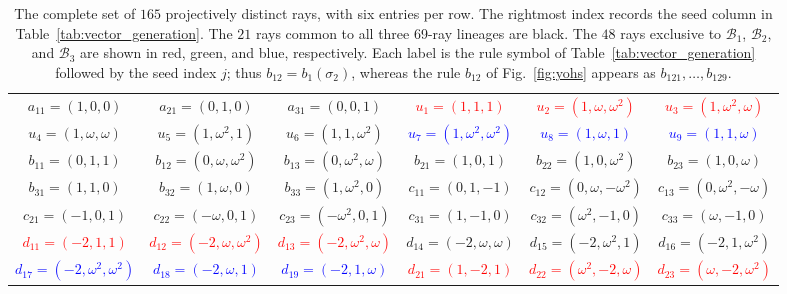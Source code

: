 \documentclass[%
  reprint,
  superscriptaddress,
  showkeys,
  amsmath,amssymb,
  aps,pra,
  longbibliography,
  floatfix,
  x11names
]{revtex4-2}
\begin{document}
\begin{table}[htbp!]
\caption{
The complete set of $165$ projectively distinct rays, with six entries per row.  The rightmost index records the seed column in Table~\ref{tab:vector_generation}.  The $21$ rays common to all three 69-ray lineages are black.  The $48$ rays exclusive to $\mathcal{B}_1$, $\mathcal{B}_2$, and $\mathcal{B}_3$ are shown in red, green, and blue, respectively.  Each label is the rule symbol of Table~\ref{tab:vector_generation} followed by the seed index $j$; thus $b_{12}=b_1(\sigma_2)$, whereas the rule $b_{12}$ of Fig.~\ref{fig:yohs} appears as $b_{121},\ldots,b_{129}$.
}
\label{tab:noncollinear_vectors_6col}
\footnotesize %
\begin{ruledtabular}
\begin{tabular}{*{6}{c}} %
{$a_{11}=(1,0,0)$} & {$a_{21}=(0,1,0)$} & {$a_{31}=(0,0,1)$} & \textcolor{red}{$u_{1}=(1,1,1)$} & \textcolor{red}{$u_{2}=(1,\omega,\omega^2)$} & \textcolor{red}{$u_{3}=(1,\omega^2,\omega)$} \\
\textcolor{green!40!black}{$u_{4}=(1,\omega,\omega)$} & \textcolor{green!40!black}{$u_{5}=(1,\omega^2,1)$} & \textcolor{green!40!black}{$u_{6}=(1,1,\omega^2)$} & \textcolor{blue}{$u_{7}=(1,\omega^2,\omega^2)$} & \textcolor{blue}{$u_{8}=(1,\omega,1)$} & \textcolor{blue}{$u_{9}=(1,1,\omega)$} \\
{$b_{11}=(0,1,1)$} & {$b_{12}=(0,\omega,\omega^2)$} & {$b_{13}=(0,\omega^2,\omega)$} & {$b_{21}=(1,0,1)$} & {$b_{22}=(1,0,\omega^2)$} & {$b_{23}=(1,0,\omega)$} \\
{$b_{31}=(1,1,0)$} & {$b_{32}=(1,\omega,0)$} & {$b_{33}=(1,\omega^2,0)$} & {$c_{11}=(0,1,-1)$} & {$c_{12}=(0,\omega,-\omega^2)$} & {$c_{13}=(0,\omega^2,-\omega)$} \\
{$c_{21}=(-1,0,1)$} & {$c_{22}=(-\omega,0,1)$} & {$c_{23}=(-\omega^2,0,1)$} & {$c_{31}=(1,-1,0)$} & {$c_{32}=(\omega^2,-1,0)$} & {$c_{33}=(\omega,-1,0)$} \\
\textcolor{red}{$d_{11}=(-2,1,1)$} & \textcolor{red}{$d_{12}=(-2,\omega,\omega^2)$} & \textcolor{red}{$d_{13}=(-2,\omega^2,\omega)$} & \textcolor{green!40!black}{$d_{14}=(-2,\omega,\omega)$} & \textcolor{green!40!black}{$d_{15}=(-2,\omega^2,1)$} & \textcolor{green!40!black}{$d_{16}=(-2,1,\omega^2)$} \\
\textcolor{blue}{$d_{17}=(-2,\omega^2,\omega^2)$} & \textcolor{blue}{$d_{18}=(-2,\omega,1)$} & \textcolor{blue}{$d_{19}=(-2,1,\omega)$} & \textcolor{red}{$d_{21}=(1,-2,1)$} & \textcolor{red}{$d_{22}=(\omega^2,-2,\omega)$} & \textcolor{red}{$d_{23}=(\omega,-2,\omega^2)$} \\

\end{tabular}
\end{ruledtabular}
\end{table}
\end{document}
